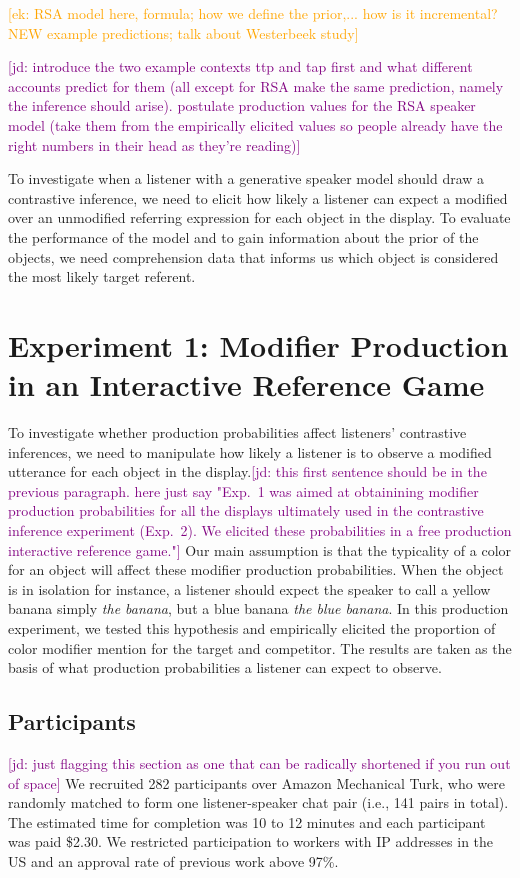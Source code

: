\documentclass[10pt,letterpaper]{article}
\newcommand{\ek}[1]{\textcolor{Orange}{[ek: #1]}}
\newcommand{\jd}[1]{\textcolor{Purple}{[jd: #1]}}
\begin{document}
\ek{RSA model here, formula; how we define the prior,...
how is it incremental? NEW
example predictions;
talk about Westerbeek study}

\jd{introduce the two example contexts ttp and tap first and what different accounts predict for them (all except for RSA make the same prediction, namely the inference should arise). postulate production values for the RSA speaker model (take them from the empirically elicited values so people already have the right numbers in their head as they're reading)}

To investigate when a listener with a generative speaker model should draw a contrastive inference, we need to elicit how likely a listener can expect a modified over an unmodified referring expression for each object in the display. To evaluate the performance of the model and to gain information about the prior of the objects, we need comprehension data that informs us which object is considered the most likely target referent.


\section{Experiment 1: Modifier Production in an Interactive Reference Game}

To investigate whether production probabilities affect listeners' contrastive inferences, we need to manipulate how likely a listener is to observe a modified utterance for each object in the display.\jd{this first sentence should be in the previous paragraph. here just say "Exp.~1 was aimed at obtainining modifier production probabilities for all the displays ultimately used in the contrastive inference  experiment (Exp.~2). We elicited these probabilities in a free production interactive reference game."} Our main assumption is that the typicality of a color for an object will affect these modifier production probabilities. When the object is in isolation for instance, a listener should expect the speaker to call a yellow banana simply \textit{the banana}, but a blue banana \textit{the blue banana}. In this production experiment, we tested this hypothesis and empirically elicited the proportion of color modifier mention for the target and competitor. The results are taken as the basis of what production probabilities a listener can expect to observe.


\subsection{Participants}
\jd{just flagging this section as one that can be radically shortened if you run out of space}
We recruited 282 participants over Amazon Mechanical Turk, who were randomly matched to form one listener-speaker chat pair (i.e., 141 pairs in total). 
The estimated time for completion was 10 to 12 minutes and each participant was paid \$2.30. We restricted participation to workers with IP addresses in the US and an approval rate of previous work above 97\%.
\end{document}
